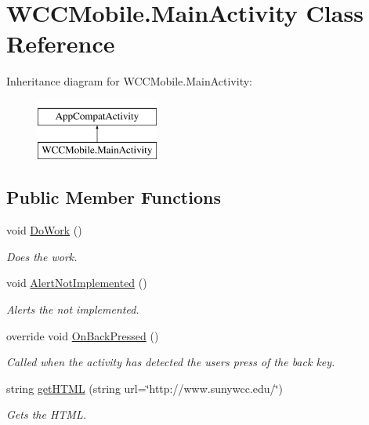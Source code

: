 \hypertarget{class_w_c_c_mobile_1_1_main_activity}{}\section{W\+C\+C\+Mobile.\+Main\+Activity Class Reference}
\label{class_w_c_c_mobile_1_1_main_activity}
Inheritance diagram for W\+C\+C\+Mobile.\+Main\+Activity\+:\begin{figure}[H]
\begin{center}
\leavevmode
\includegraphics[height=2.000000cm]{class_w_c_c_mobile_1_1_main_activity}
\end{center}
\end{figure}
\subsection*{Public Member Functions}
\begin{DoxyCompactItemize}
\item 
void \hyperlink{class_w_c_c_mobile_1_1_main_activity_accc284f1d0d4e2ae045db80981c51bc8}{Do\+Work} ()
\begin{DoxyCompactList}\small\item\em Does the work. \end{DoxyCompactList}\item 
void \hyperlink{class_w_c_c_mobile_1_1_main_activity_a9505a34d42917317eff31a4e7872b7d6}{Alert\+Not\+Implemented} ()
\begin{DoxyCompactList}\small\item\em Alerts the not implemented. \end{DoxyCompactList}\item 
override void \hyperlink{class_w_c_c_mobile_1_1_main_activity_a6d31456aafea0e368a6899dbb2c81ae2}{On\+Back\+Pressed} ()
\begin{DoxyCompactList}\small\item\em Called when the activity has detected the user\textquotesingle{}s press of the back key. \end{DoxyCompactList}\item 
string \hyperlink{class_w_c_c_mobile_1_1_main_activity_a58c410fc67bdc0feb2d8130f55fa4948}{get\+H\+T\+ML} (string url=\char`\"{}http\+://www.\+sunywcc.\+edu/\char`\"{})
\begin{DoxyCompactList}\small\item\em Gets the H\+T\+ML. \end{DoxyCompactList}\end{DoxyCompactItemize}
